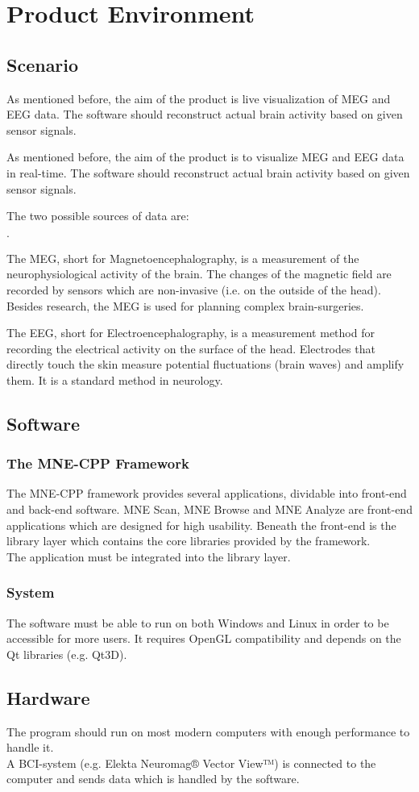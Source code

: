 \section {Product Environment}
\subsection{Scenario}

As mentioned before, the aim of the product is live visualization of MEG and EEG data. The software should reconstruct actual brain activity based on given sensor signals.

As mentioned before, the aim of the product is to visualize MEG and EEG data in real-time. The software should reconstruct actual brain activity based on given sensor signals.

The two possible sources of data are:
\begin{list}{$\cdot$}{}

\item The MEG, short for Magnetoencephalography, is a measurement of the neurophysiological activity of the brain. The changes of the magnetic field are recorded by sensors which are non-invasive (i.e. on the outside of the head). Besides research, the MEG is used for planning complex brain-surgeries.

\item The EEG, short for Electroencephalography, is a measurement method for recording the electrical activity on the surface of the head. Electrodes that directly touch the skin measure potential fluctuations (brain waves) and amplify them. It is a standard method in neurology.
\end{list}

\subsection{Software}
\subsubsection{The MNE-CPP Framework}The MNE-CPP framework provides several applications, dividable into front-end and back-end software. MNE Scan, MNE Browse and MNE Analyze are front-end applications which are designed for high usability.
Beneath the front-end is the library layer which contains the core libraries provided by the framework.\\
The application must be integrated into the library layer.
\subsubsection{System}
The software must be able to run on both Windows and Linux in order to be accessible for more users. It requires OpenGL compatibility and depends on the Qt libraries (e.g. Qt3D).
\subsection{Hardware}
The program should run on most modern computers with enough performance to handle it. \\
A BCI-system (e.g. Elekta Neuromag® Vector View™) is connected to the computer and sends data which is handled by the software.
